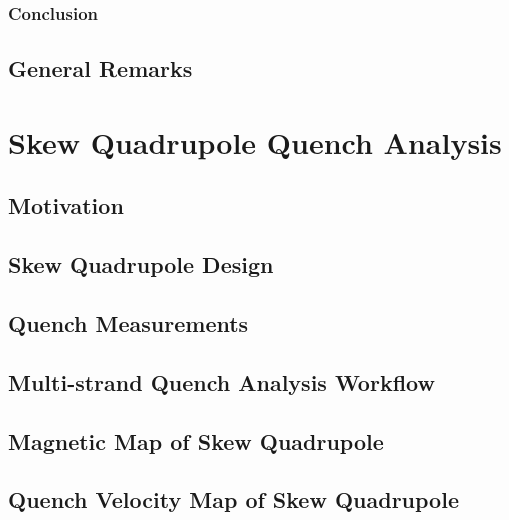 \documentclass[11pt,a4paper]{report}
\begin{document}
\subsection{Conclusion}


\section{General Remarks}


\clearpage
\chapter{Skew Quadrupole Quench Analysis}
\label{chapter:skew_quadrupole_quench_detection_analysis}

\section{Motivation}


\section{Skew Quadrupole Design}


\section{Quench Measurements}
\label{section:quench_measurements}


\section{Multi-strand Quench Analysis Workflow}


\section{Magnetic Map of Skew Quadrupole}
\label{section: magnetic_map_skew_quad}


\section{Quench Velocity Map of Skew Quadrupole}

\end{document}
